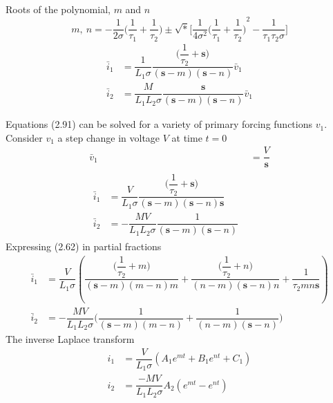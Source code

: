 \documentclass[a4paper,numbers=noenddot,12pt]{scrbook}
\begin{document}
                Roots of the polynomial, $m$ and $n$
                \begin{equation}
                    m,\ n = - \dfrac{1}{2 \sigma} \Big(\dfrac{1}{\tau_1} + \dfrac{1}{\tau_2}\Big) \pm \sqrt*{\Big[ \dfrac{1}{4 \sigma^2} {\Big( \dfrac{1}{\tau_1} + \dfrac{1}{\tau_2} \Big)}^2 - \dfrac{1}{\tau_1 \tau_2 \sigma}\Big]}
                    \label{eq:Eq2.60}
                \end{equation}
                \begin{equation}
                    \begin{aligned}
                        \bar{i}_1 & = \dfrac{1}{L_1 \sigma} \dfrac{\Big( \dfrac{1}{\tau_2} + \mathbf{s}\Big)}{(\mathbf{s} -m)(\mathbf{s} - n)} \bar{v}_1 \\ %
                        \bar{i}_2 & = \dfrac{M}{L_1 L_2 \sigma} \dfrac{\mathbf{s}}{(\mathbf{s} -m)(\mathbf{s} - n)} \bar{v}_1  %
                    \end{aligned}
                    \label{eq:Eq2.61}
                \end{equation}

                Equations (2.91) can be solved for a variety of primary forcing functions $v_1$. Consider $v_1$ a step change in voltage $V$ at time $t = 0$
                \begin{align}
                    \bar{v}_1 & = \dfrac{V}{\mathbf{s}} \nonumber \\
                    \begin{split}
                        \bar{i}_1 & = \dfrac{V}{L_1 \sigma} \dfrac{\Big( \dfrac{1}{\tau_2} + \mathbf{s}\Big)}{(\mathbf{s} - m)(\mathbf{s} -n)\mathbf{s}} \\ %
                        \bar{i}_2 & = -\dfrac{M V}{L_1 L_2 \sigma} \dfrac{1}{(\mathbf{s} - m)(\mathbf{s} - n)} %
                    \end{split}
                    \label{eq:Eq2.62}
                \end{align}
                Expressing (2.62) in partial fractions
                \begin{align*}
                    \bar{i}_1 & = \dfrac{V}{L_1 \sigma} \left( \dfrac{\Big( \dfrac{1}{\tau_2} + m\Big)}{(\mathbf{s} - m)(m - n) m} + \dfrac{\Big( \dfrac{1}{\tau_2} + n \Big)}{(n - m)(\mathbf{s} - n)n} + \dfrac{1}{\tau_2 m n \mathbf{s}} \right) \\ %
                    \bar{i}_2 & = -\dfrac{M V}{L_1 L_2 \sigma} \Big(\dfrac{1}{(\mathbf{s} - m)(m - n)} + \dfrac{1}{(n - m)(\mathbf{s} - n)}\Big) %
                \end{align*}
                The inverse Laplace transform
                \begin{equation}
                    \begin{aligned}
                        i_1 & = \dfrac{V}{L_1 \sigma}(A_1 e^{mt} + B_1 e^{nt} + C_1)\\
                        i_2 & = \dfrac{-M V}{L_1 L_2 \sigma} A_2 (e^{mt} - e^{nt})
                    \end{aligned}
                    \label{eq:Eq2.63}
                \end{equation}
\end{document}
